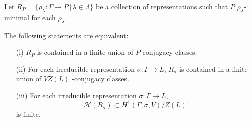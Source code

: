 \begin{lemma}
  Let $R_P = \{\rho_\lambda:\Gamma\rightarrow P\,|\,\lambda\in\Lambda\}$ be a collection of representations such that $P$ $\rho_\lambda$-minimal for each $\rho_\lambda$.
  
  The following statements are equivalent:
  \begin{itemize}
    \item[(i)] $R_P$ is contained in a finite union of $P$-conjugacy classes.
    \item[(ii)] For each irreducible representation $\sigma:\Gamma\rightarrow L$, $R_{\sigma}$ is contained in a finite union of $VZ(L)^\circ$-conjugacy classes.
    \item[(iii)] For each irreducible representation $\sigma:\Gamma\rightarrow L$,
      \begin{displaymath}
	\mathcal{H}(R_{\sigma}) \subset H^{1}(\Gamma,\sigma,V)/Z(L)^\circ
      \end{displaymath}
      is finite.
  \end{itemize}
  \label{lem:p_h1}
\end{lemma}

